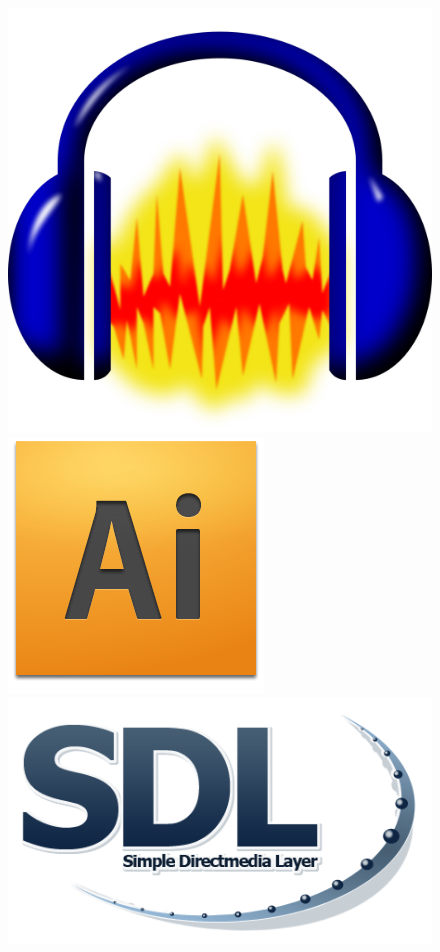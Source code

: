 \documentclass[11pt]{article} %
\begin{document}
\begin{figure}[!htp]
\begin{center}
  \includegraphics[scale=0.04]{res/audacity.png} \quad
  \includegraphics[scale=0.3]{res/adobe_illustrator.png} \quad
  \includegraphics[scale=0.25]{res/Sdl-logo.png} \quad

\end{center}
\end{figure}
\end{document}
